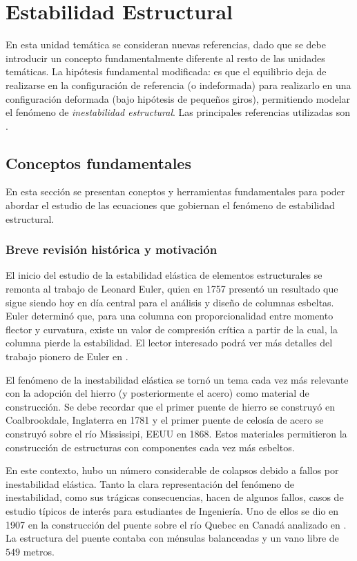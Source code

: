\chapter{Estabilidad Estructural}

En esta unidad temática se consideran nuevas referencias, dado que se debe introducir un concepto fundamentalmente diferente al resto de las unidades temáticas. %
%
La hipótesis fundamental modificada: es que el equilibrio deja de realizarse en la configuración de referencia (o indeformada) para realizarlo en una configuración deformada (bajo hipótesis de pequeños giros), permitiendo modelar el fenómeno de \textit{inestabilidad estructural}. %
%
Las principales referencias utilizadas son \citep{yoo2011,Bazzano2017}. 

\section{Conceptos fundamentales} 

En esta sección se presentan coneptos y herramientas fundamentales para poder abordar el estudio de las ecuaciones que gobiernan el fenómeno de estabilidad estructural.

\subsection{Breve revisión histórica y motivación}

El inicio del estudio de la estabilidad elástica de elementos estructurales se remonta al trabajo de Leonard Euler, quien en 1757 presentó un resultado que sigue siendo hoy en día central para el análisis y diseño de columnas esbeltas. %
%
Euler determinó que, para una columna con proporcionalidad entre momento flector y curvatura, existe un valor de compresión crítica a partir de la cual, la columna pierde la estabilidad. %
%
El lector interesado podrá ver más detalles del trabajo pionero de Euler en \citep{Timoshenko1953}.

El fenómeno de la inestabilidad elástica se tornó un tema cada vez más relevante con la adopción del hierro (y posteriormente el acero) como material de construcción. %
%
Se debe recordar que el primer puente de hierro se construyó en Coalbrookdale, Inglaterra en 1781 y el primer puente de celosía de acero se construyó sobre el río Mississipi, EEUU en 1868.  Estos materiales permitieron la construcción de estructuras con componentes cada vez más esbeltos. 

En este contexto, hubo un número considerable de colapsos debido a fallos por inestabilidad elástica. %
%
Tanto la clara representación del fenómeno de inestabilidad, como sus trágicas consecuencias, hacen de algunos fallos, casos de estudio típicos de interés para estudiantes de Ingeniería. %
%
Uno de ellos se dio en 1907 en la construcción del puente sobre el río Quebec en Canadá analizado en \citep{Brady2014}. %
%
La estructura del puente contaba con ménsulas balanceadas y un vano libre de $549$ metros. %

